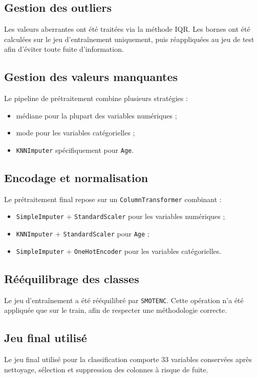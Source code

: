 \documentclass[11pt,a4paper]{article}
\begin{document}
\subsection{Gestion des outliers}
Les valeurs aberrantes ont été traitées via la méthode IQR. Les bornes ont été calculées sur le jeu d’entraînement uniquement, puis réappliquées au jeu de test afin d’éviter toute fuite d’information.

\subsection{Gestion des valeurs manquantes}
Le pipeline de prétraitement combine plusieurs stratégies :
\begin{itemize}
    \item médiane pour la plupart des variables numériques ;
    \item mode pour les variables catégorielles ;
    \item \texttt{KNNImputer} spécifiquement pour \texttt{Age}.
\end{itemize}

\subsection{Encodage et normalisation}
Le prétraitement final repose sur un \texttt{ColumnTransformer} combinant :
\begin{itemize}
    \item \texttt{SimpleImputer} + \texttt{StandardScaler} pour les variables numériques ;
    \item \texttt{KNNImputer} + \texttt{StandardScaler} pour \texttt{Age} ;
    \item \texttt{SimpleImputer} + \texttt{OneHotEncoder} pour les variables catégorielles.
\end{itemize}

\subsection{Rééquilibrage des classes}
Le jeu d’entraînement a été rééquilibré par \texttt{SMOTENC}. Cette opération n’a été appliquée que sur le train, afin de respecter une méthodologie correcte.

\subsection{Jeu final utilisé}
Le jeu final utilisé pour la classification comporte 33 variables conservées après nettoyage, sélection et suppression des colonnes à risque de fuite.
\end{document}
